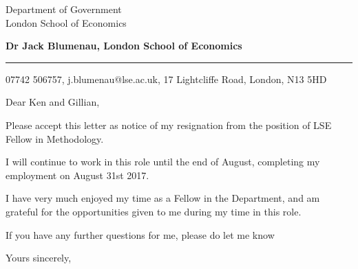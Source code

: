 \documentclass{letter} %
\begin{document}
\signature{Jack \\ ~\\ Dr Jack Blumenau}           %
\longindentation=0pt                       %
\let\raggedleft\raggedright                %
 
 
\begin{letter}{Department of Government \\
London School of Economics}


\begin{flushleft}
{\large\bf Dr Jack Blumenau, London School of Economics}
\end{flushleft}
\medskip\hrule height 1pt
\begin{flushright}
\hfill 07742 506757, j.blumenau@lse.ac.uk, 17 Lightcliffe Road, London, N13 5HD 
\end{flushright} 
\vfill %

 
\opening{Dear Ken and Gillian,} 
 
\noindent Please accept this letter as notice of my resignation from the position of LSE Fellow in Methodology.
 
\noindent I will continue to work in this role until the end of August, completing my employment on August 31st 2017.

\noindent I have very much enjoyed my time as a Fellow in the Department, and am grateful for the opportunities given to me during my time in this role.

\noindent If you have any further questions for me, please do let me know
 
\closing{Yours sincerely,} 
 \vfill

 \vfill
\vfill
\vfill
\end{letter}
 
\end{document}
